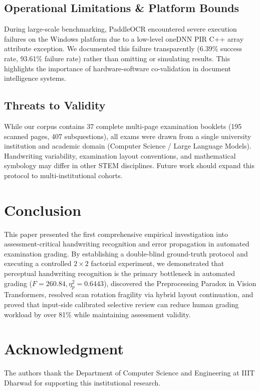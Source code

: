 \documentclass[journal]{IEEEtran}
\begin{document}
\subsection{Operational Limitations & Platform Bounds}
During large-scale benchmarking, PaddleOCR encountered severe execution failures on the Windows platform due to a low-level oneDNN PIR C++ array attribute exception. We documented this failure transparently (6.39\% success rate, 93.61\% failure rate) rather than omitting or simulating results. This highlights the importance of hardware-software co-validation in document intelligence systems.

\subsection{Threats to Validity}
While our corpus contains 37 complete multi-page examination booklets (195 scanned pages, 407 subquestions), all exams were drawn from a single university institution and academic domain (Computer Science / Large Language Models). Handwriting variability, examination layout conventions, and mathematical symbology may differ in other STEM disciplines. Future work should expand this protocol to multi-institutional cohorts.

\section{Conclusion}
This paper presented the first comprehensive empirical investigation into assessment-critical handwriting recognition and error propagation in automated examination grading. By establishing a double-blind ground-truth protocol and executing a controlled $2 \times 2$ factorial experiment, we demonstrated that perceptual handwriting recognition is the primary bottleneck in automated grading ($F = 260.84, \eta_p^2 = 0.6443$), discovered the Preprocessing Paradox in Vision Transformers, resolved scan rotation fragility via hybrid layout continuation, and proved that input-side calibrated selective review can reduce human grading workload by over 81\% while maintaining assessment validity.

\section*{Acknowledgment}
The authors thank the Department of Computer Science and Engineering at IIIT Dharwad for supporting this institutional research.



\end{document}
